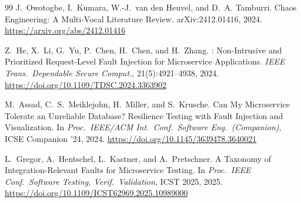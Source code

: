 \documentclass[sigconf,authorversion,nonacm]{acmart}
\begin{document}
\begin{thebibliography}{99}
J.~Owotogbe, I.~Kumara, W.-J.~van den Heuvel, and D.~A. Tamburri.
\newblock Chaos Engineering: A Multi-Vocal Literature Review.
\newblock arXiv:2412.01416, 2024.
\newblock \url{https://arxiv.org/abs/2412.01416}

Z.~He, X.~Li, G.~Yu, P.~Chen, H.~Chen, and H.~Zhang.
: Non-Intrusive and Prioritized Request-Level Fault Injection for Microservice Applications.
\newblock \emph{IEEE Trans.\ Dependable Secure Comput.}, 21(5):4921--4938, 2024.
\newblock \url{https://doi.org/10.1109/TDSC.2024.3363902}

M.~Assad, C.~S.~Meiklejohn, H.~Miller, and S.~Krusche.
\newblock Can My Microservice Tolerate an Unreliable Database? Resilience Testing with Fault Injection and Visualization.
\newblock In \emph{Proc.\ IEEE/ACM Int.\ Conf.\ Software Eng.\ (Companion)}, ICSE Companion '24, 2024.
\newblock \url{https://doi.org/10.1145/3639478.3640021}

L.~Gregor, A.~Hentschel, L.~Kastner, and A.~Pretschner.
\newblock A Taxonomy of Integration-Relevant Faults for Microservice Testing.
\newblock In \emph{Proc.\ IEEE Conf.\ Software Testing, Verif.\ Validation}, ICST 2025, 2025.
\newblock \url{https://doi.org/10.1109/ICST62969.2025.10989000}
\end{thebibliography}

\balance
\end{document}
